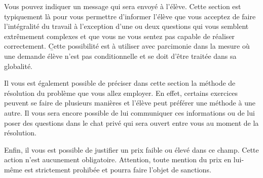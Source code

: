 Vous pouvez indiquer un message qui sera envoyé à l'élève. Cette section est typiquement là pour vous permettre d'informer l'élève que vous acceptez de faire l'intégralité du travail à l'exception d'une ou deux questions qui vous semblent extrêmement complexes et que vous ne vous sentez pas capable de réaliser correctement. \b{Cette possibilité est à utiliser avec parcimonie} dans la mesure où une demande élève n'est pas conditionnelle et se doit d'être traitée dans sa globalité.

Il vous est également possible de préciser dans cette section la méthode de résolution du problème que vous allez employer. En effet, certains exercices peuvent se faire de plusieurs manières et l'élève peut préférer une méthode à une autre. Il vous sera encore possible de lui communiquer ces informations ou de lui poser des questions dans le chat privé qui sera ouvert entre vous au moment de la résolution.

Enfin, il vous est possible de justifier un prix faible ou élevé dans ce champ. Cette action n'est aucunement obligatoire. Attention, toute mention du prix en lui-même est strictement prohibée et pourra faire l'objet de sanctions.